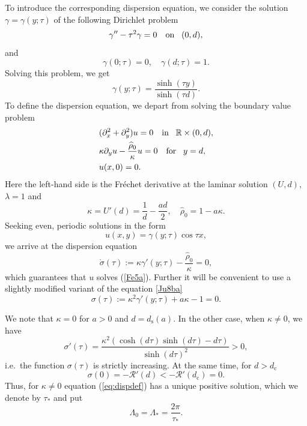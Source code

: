 \documentclass[oneside,a4paper,11pt]{article}
\theoremstyle{thmstyletwo}%
\theoremstyle{thmstylethree}%
\numberwithin{equation}{section}
\def\gamm{\gamma}
\def\dcrit{d_{\textrm{c}}}
\def\ds{d_{\textrm{s}}}
\def\taust{\tau_{*}}
\def\Disp{\sigma}
\def\DispOld{\mathring{\sigma}}
\def\dUd{\kappa}
\def\mddU{a}
\begin{document}
To introduce the corresponding dispersion equation, we consider the solution $\gamm=\gamm(y;\tau)$ of the following Dirichlet problem
\begin{equation*}%
\gamm''-\tau^2\gamm=0\quad\mbox{on\!}\quad (0,d),
\end{equation*}
and
\begin{equation*}%
\gamm(0;\tau)=0,\quad\gamm(d;\tau)=1.
\end{equation*}
Solving this problem, we get
$$
\gamm(y;\tau)=\frac{\sinh(\tau y)}{\sinh(\tau d)}.
$$
To define the dispersion equation, we depart from solving the boundary value problem
\begin{equation}\label{Fe5a}
\begin{aligned}
&(\partial_x^2+\partial_y^2)u=0\quad\mbox{in\!}\quad\mathbb{R}\times (0,d),\\
&\dUd\partial_yu-\frac{\widehat{\rho}_0}{\dUd}u=0\quad\mbox{for\!}\quad y=d,\\
&u(x,0)=0.
\end{aligned}
\end{equation}
Here the left-hand side is the Fr\'{e}chet derivative at the laminar solution $(U,d)$, $\lambda=1$ and
$$
\dUd=U'(d)=\frac{1}{d}-\frac{ad}{2},\quad\widehat{\rho}_0=1-\mddU\dUd.
$$
Seeking even, periodic solutions in the form
$$
u(x,y)=\gamm(y;\tau)\cos \tau x,
$$
we arrive at  the dispersion equation
\begin{equation}\label{Ju8ba}
\DispOld(\tau):=\dUd\gamm'(y;\tau)-\frac{\widehat{\rho}_0}{\dUd}=0,
\end{equation}
which guarantees that $u$ solves (\ref{Fe5a}). Further it will be convenient to use a slightly modified variant of the equation \eqref{Ju8ba}
\begin{equation}\label{eq:dispdef}
\Disp(\tau):=\dUd^2\gamm'(y;\tau)+\mddU\dUd-1=0.
\end{equation}

We note that $\dUd=0$ for $a>0$ and $d=\ds(a)$. In the other case, when $\dUd\neq0$, we have
$$
\Disp'(\tau)=\frac{\dUd^2(\cosh(d\tau)\sinh(d\tau)-d\tau)}{\sinh(d\tau)^2}>0,
$$
i.e.\ the function $\Disp(\tau)$ is strictly increasing. At the same time, for $d>\dcrit$
$$
\Disp(0)=-\mathcal{R}'(d)<-\mathcal{R}'(\dcrit)=0.
$$
Thus, for $\dUd\neq0$ equation (\ref{eq:dispdef}) has a unique positive solution, which we denote by
$\taust$ and put
\begin{equation*} %
\Lambda_0=\Lambda_*=\frac{2\pi}{\taust}.
\end{equation*}
\end{document}
